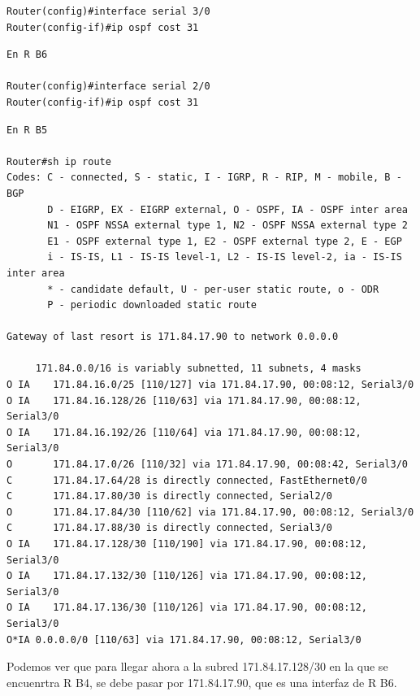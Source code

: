 \documentclass[11pt]{article}
\begin{document}
\begin{enumerate}
\begin{mdframed}
\begin{verbatim}
Router(config)#interface serial 3/0
Router(config-if)#ip ospf cost 31
\end{verbatim}
\end{mdframed}

\begin{mdframed}
\begin{verbatim}
En R B6

Router(config)#interface serial 2/0
Router(config-if)#ip ospf cost 31
\end{verbatim}
\end{mdframed}

\begin{mdframed}
\begin{verbatim}
En R B5

Router#sh ip route 
Codes: C - connected, S - static, I - IGRP, R - RIP, M - mobile, B - BGP
       D - EIGRP, EX - EIGRP external, O - OSPF, IA - OSPF inter area
       N1 - OSPF NSSA external type 1, N2 - OSPF NSSA external type 2
       E1 - OSPF external type 1, E2 - OSPF external type 2, E - EGP
       i - IS-IS, L1 - IS-IS level-1, L2 - IS-IS level-2, ia - IS-IS inter area
       * - candidate default, U - per-user static route, o - ODR
       P - periodic downloaded static route

Gateway of last resort is 171.84.17.90 to network 0.0.0.0

     171.84.0.0/16 is variably subnetted, 11 subnets, 4 masks
O IA    171.84.16.0/25 [110/127] via 171.84.17.90, 00:08:12, Serial3/0
O IA    171.84.16.128/26 [110/63] via 171.84.17.90, 00:08:12, Serial3/0
O IA    171.84.16.192/26 [110/64] via 171.84.17.90, 00:08:12, Serial3/0
O       171.84.17.0/26 [110/32] via 171.84.17.90, 00:08:42, Serial3/0
C       171.84.17.64/28 is directly connected, FastEthernet0/0
C       171.84.17.80/30 is directly connected, Serial2/0
O       171.84.17.84/30 [110/62] via 171.84.17.90, 00:08:12, Serial3/0
C       171.84.17.88/30 is directly connected, Serial3/0
O IA    171.84.17.128/30 [110/190] via 171.84.17.90, 00:08:12, Serial3/0
O IA    171.84.17.132/30 [110/126] via 171.84.17.90, 00:08:12, Serial3/0
O IA    171.84.17.136/30 [110/126] via 171.84.17.90, 00:08:12, Serial3/0
O*IA 0.0.0.0/0 [110/63] via 171.84.17.90, 00:08:12, Serial3/0
\end{verbatim}
\end{mdframed}

Podemos ver que para llegar ahora a la subred 171.84.17.128/30 en la que se encuenrtra R B4, se debe pasar por 171.84.17.90, que es una interfaz de R B6.


\end{enumerate}
\end{document}
